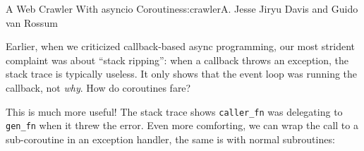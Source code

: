 \begin{aosachapter}{A Web Crawler With asyncio Coroutines}{s:crawler}{A. Jesse Jiryu Davis and Guido van Rossum}
\begin{Shaded}
\begin{Highlighting}[]
      
\end{Highlighting}
\end{Shaded}

Earlier, when we criticized callback-based async programming, our most
strident complaint was about ``stack ripping'': when a callback throws
an exception, the stack trace is typically useless. It only shows that
the event loop was running the callback, not \emph{why}. How do
coroutines fare?

\begin{Shaded}
\begin{Highlighting}[]
\NormalTok{>>> } 
 \NormalTok{(}\NormalTok{)}
\NormalTok{)}
\end{Highlighting}
\end{Shaded}

This is much more useful! The stack trace shows \texttt{caller\_fn} was
delegating to \texttt{gen\_fn} when it threw the error. Even more
comforting, we can wrap the call to a sub-coroutine in an exception
handler, the same is with normal subroutines:

\begin{Shaded}
\begin{Highlighting}[]
\NormalTok{>>> } 
 
 \NormalTok{(}\NormalTok{)}
\NormalTok{>>> } 
\NormalTok{:}
  
   
\NormalTok{(}
\NormalTok{)}
\NormalTok{)}
\end{Highlighting}
\end{Shaded}


\end{aosachapter}
